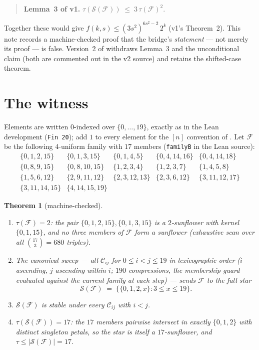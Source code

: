 \documentclass[11pt,a4paper]{article}
\newtheorem{theorem}{Theorem}
\theoremstyle{remark}
\newcommand{\cC}{\mathcal{C}}
\newcommand{\cF}{\mathcal{F}}
\newcommand{\cS}{\mathcal{S}}
\begin{document}
\begin{quote}
\textbf{Lemma~3 of \cite{Mi26}v1.}\quad
$\tau(\cS(\cF))\;\le\;3\,\tau(\cF)^{2}$.
\end{quote}

\noindent Together these would give $f(k,s)\le(3s^{2})^{6s^{2}-2}\,2^{k}$
(v1's Theorem~2). This note records a machine-checked proof that the
bridge's \emph{statement} --- not merely its proof --- is false.
Version~2 of \cite{Mi26} withdraws Lemma~3 and the unconditional claim
(both are commented out in the v2 source) and retains the shifted-case
theorem.

\section{The witness}

Elements are written $0$-indexed over $\{0,\dots,19\}$, exactly as in
the Lean development (\texttt{Fin 20}); add $1$ to every element for
the $[n]$ convention of \cite{Mi26}. Let $\cF$ be the following
$4$-uniform family with $17$ members (\texttt{familyB} in the Lean
source):
\[
\begin{array}{lllll}
\{0,1,2,15\} & \{0,1,3,15\} & \{0,1,4,5\} & \{0,4,14,16\} & \{0,4,14,18\}\\
\{0,8,9,15\} & \{0,8,10,15\} & \{1,2,3,4\} & \{1,2,3,7\} & \{1,4,5,8\}\\
\{1,5,6,12\} & \{2,9,11,12\} & \{2,3,12,13\} & \{2,3,6,12\} & \{3,11,12,17\}\\
\{3,11,14,15\} & \{4,14,15,19\}
\end{array}
\]

\begin{theorem}[machine-checked]\label{thm:witness}
\leavevmode
\begin{enumerate}
\item $\tau(\cF)=2$: the pair $\{0,1,2,15\},\{0,1,3,15\}$ is a
$2$-sunflower with kernel $\{0,1,15\}$, and no three members of $\cF$
form a sunflower (exhaustive scan over all
$\binom{17}{3}=680$ triples).
\item The canonical sweep --- all $\cC_{ij}$ for
$0\le i<j\le19$ in lexicographic order ($i$ ascending, $j$ ascending
within $i$; $190$ compressions, the membership guard evaluated against
the current family at each step) --- sends $\cF$ to the full star
\[
  \cS(\cF)\;=\;\bigl\{\{0,1,2,x\}:3\le x\le19\bigr\}.
\]
\item $\cS(\cF)$ is stable under every $\cC_{ij}$ with $i<j$.
\item $\tau(\cS(\cF))=17$: the $17$ members pairwise intersect in
exactly $\{0,1,2\}$ with distinct singleton petals, so the star is
itself a $17$-sunflower, and $\tau\le|\cS(\cF)|=17$.
\end{enumerate}
\end{theorem}
\end{document}
